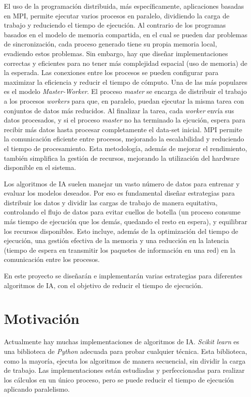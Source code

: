 	El uso de la programación distribuida, más específicamente, aplicaciones basadas en MPI, permite ejecutar varios procesos en paralelo, dividiendo la carga de trabajo y reduciendo el tiempo de ejecución. Al contrario de los programas basados en el modelo de memoria compartida, en el cual se pueden dar problemas de sincronización, cada proceso generado tiene su propia memoria local, evadiendo estos problemas. Sin embargo, hay que diseñar implementaciones correctas y eficientes para no tener más complejidad espacial (uso de memoria) de la esperada. Las conexiones entre los procesos se pueden configurar para maximizar la eficiencia y reducir el tiempo de cómputo. Una de las más populares es el modelo \textit{Master-Worker}. El proceso \textit{master} se encarga de distribuir el trabajo a los procesos \textit{workers} para que, en paralelo, puedan ejecutar la misma tarea con conjuntos de datos más reducidos. Al finalizar la tarea, cada \textit{worker} envía sus datos procesados, y si el proceso \textit{master} no ha terminado la ejcución, espera para recibir más datos hasta procesar completamente el data-set inicial. MPI permite la comunicación eficiente entre procesos, mejorando la escalabilidad y reduciendo el tiempo de procesamiento. Esta metodología, además de mejorar el rendimiento, también simplifica la gestión de recursos, mejorando la utilización del hardware disponible en el sistema. 
	
	Los algoritmos de IA suelen manejar un vasto número de datos para entrenar y evaluar los modelos deseados. Por eso es fundamental diseñar estrategias para distribuir los datos y dividir las cargas de trabajo de manera equitativa, controlando el flujo de datos para evitar cuellos de botella (un proceso consume más tiempo de ejecución que los demás, quedando el resto en espera), y equilibrar los recursos disponibles. Esto incluye, además de la optimización del tiempo de ejecución, una gestión efectiva de la memoria y una reducción en la latencia (tiempo de espera en transmitir los paquetes de información en una red) en la comunicación entre los procesos. 
	
	En este proyecto se diseñarán e implementarán varias estrategias para diferentes algoritmos de IA, con el objetivo de reducir el tiempo de ejecución.





\section{Motivación}
	Actualmente hay muchas implementaciones de algoritmos de IA. \textit{Scikit learn} es una biblioteca de \textit{Python} adecuada para probar cualquier técnica. Esta biblioteca, como la mayoría, ejecuta los algoritmos de manera secuencial, sin dividir la carga de trabajo. Las implementaciones están estudiadas y perfeccionadas para realizar los cálculos en un único proceso, pero se puede reducir el tiempo de ejecución aplicando paralelismo. 
	

